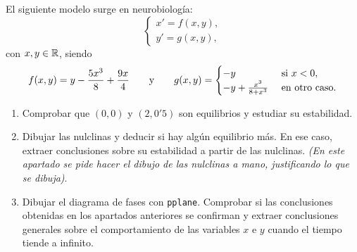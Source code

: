 \documentclass[11pt]{report}
\begin{document}
\addtocounter{exercise}{1}

\begin{exercise}
    El siguiente modelo surge en neurobiología:
    \[\begin{cases}
        x' = f(x,y), \\
        y' = g(x,y),
    \end{cases}\]
    con $x,y\in\mathbb R$, siendo
    \[f(x,y) = y-\frac{5x^3}{8}+\frac{9x}{4} \qquad\textup{y}\qquad g(x,y)=\begin{cases}
        -y & $ si $ x < 0, \\
        -y+\frac{x^3}{8+x^3} & $ en otro caso$.
    \end{cases}\]
    \begin{enumerate}
        \item Comprobar que $(0,0)$ y $(2,0'5)$ son equilibrios y estudiar su estabilidad.
        \item Dibujar las nulclinas y deducir si hay algún equilibrio más. En ese caso, extraer conclusiones sobre su estabilidad a partir de las nulclinas. \emph{(En este apartado se pide hacer el dibujo de las nulclinas a mano, justificando lo que se dibuja)}.
        \item Dibujar el diagrama de fases con \texttt{pplane}. Comprobar si las conclusiones obtenidas en los apartados anteriores se confirman y extraer conclusiones generales sobre el comportamiento de las variables $x$ e $y$ cuando el tiempo tiende a infinito.
    \end{enumerate}
\end{exercise}
\end{document}
